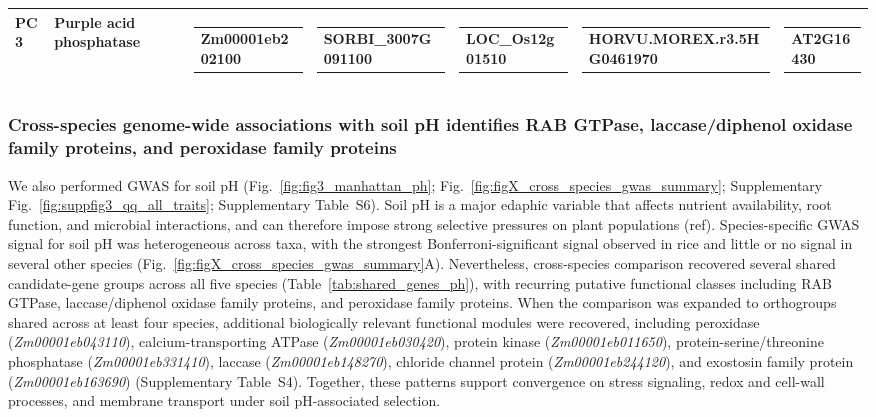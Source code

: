 \documentclass[unnumsec,webpdf,contemporary,large]{oup-authoring-template}%
\theoremstyle{thmstyleone}%
\theoremstyle{thmstyletwo}%
\theoremstyle{thmstylethree}%
\begin{document}
\begin{table}[t]
\begin{tabular*}{\textwidth}{@{\extracolsep{\fill}}lllllll@{}}
PC3 &
Purple acid phosphatase
&
\begin{tabular}[t]{@{}l@{}}
Zm00001eb202100
\end{tabular}
&
\begin{tabular}[t]{@{}l@{}}
SORBI\_3007G091100
\end{tabular}
&
\begin{tabular}[t]{@{}l@{}}
LOC\_Os12g01510
\end{tabular}
&
\begin{tabular}[t]{@{}l@{}}
HORVU.MOREX.r3.5HG0461970
\end{tabular}
&
\begin{tabular}[t]{@{}l@{}}
AT2G16430
\end{tabular}
\\

\bottomrule
\end{tabular*}
\end{table}

\subsubsection{Cross-species genome-wide associations with soil pH identifies  RAB GTPase, laccase/diphenol oxidase family proteins, and peroxidase family proteins}

We also performed GWAS for soil pH (Fig.~\ref{fig:fig3_manhattan_ph}; Fig.~\ref{fig:figX_cross_species_gwas_summary}; Supplementary Fig.~\ref{fig:suppfig3_qq_all_traits}; Supplementary Table~S6). Soil pH is a major edaphic variable that affects nutrient availability, root function, and microbial interactions, and can therefore impose strong selective pressures on plant populations (ref). Species-specific GWAS signal for soil pH was heterogeneous across taxa, with the strongest Bonferroni-significant signal observed in rice and little or no signal in several other species (Fig.~\ref{fig:figX_cross_species_gwas_summary}A). Nevertheless, cross-species comparison recovered several shared candidate-gene groups across all five species (Table~\ref{tab:shared_genes_ph}), with recurring putative functional classes including RAB GTPase, laccase/diphenol oxidase family proteins, and peroxidase family proteins. When the comparison was expanded to orthogroups shared across at least four species, additional biologically relevant functional modules were recovered, including peroxidase (\textit{Zm00001eb043110}), calcium-transporting ATPase (\textit{Zm00001eb030420}), protein kinase (\textit{Zm00001eb011650}), protein-serine/threonine phosphatase (\textit{Zm00001eb331410}), laccase (\textit{Zm00001eb148270}), chloride channel protein (\textit{Zm00001eb244120}), and exostosin family protein (\textit{Zm00001eb163690}) (Supplementary Table~S4). Together, these patterns support convergence on stress signaling, redox and cell-wall processes, and membrane transport under soil pH-associated selection.
\end{document}
